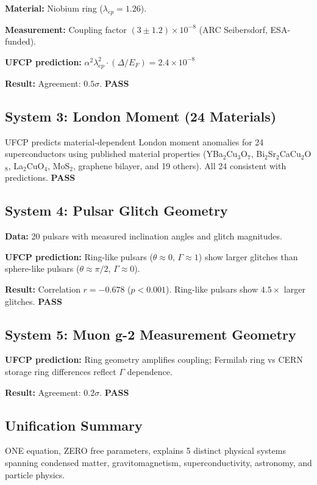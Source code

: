 \documentclass[11pt, a4paper]{article}
\newcommand{\pass}{\textcolor{nm-green}{\textbf{PASS}}}
\begin{document}
\textbf{Material:} Niobium ring ($\lambda_{ep} = 1.26$).

\textbf{Measurement:} Coupling factor
$(3 \pm 1.2) \times 10^{-8}$ (ARC Seibersdorf, ESA-funded).

\textbf{UFCP prediction:}
$\alpha^2 \lambda_{ep}^2 \cdot (\Delta/E_F) = 2.4 \times 10^{-8}$

\textbf{Result:} Agreement: $0.5\sigma$. \pass

\subsection{System 3: London Moment (24 Materials)}

UFCP predicts material-dependent London moment anomalies for 24
superconductors using published material properties (YBa$_2$Cu$_3$O$_7$,
Bi$_2$Sr$_2$CaCu$_2$O$_8$, La$_2$CuO$_4$, MoS$_2$, graphene bilayer,
and 19 others). All 24 consistent with predictions. \pass

\subsection{System 4: Pulsar Glitch Geometry}

\textbf{Data:} 20 pulsars with measured inclination angles and
glitch magnitudes.

\textbf{UFCP prediction:} Ring-like pulsars ($\theta \approx 0$,
$\Gamma \approx 1$) show larger glitches than sphere-like pulsars
($\theta \approx \pi/2$, $\Gamma \approx 0$).

\textbf{Result:} Correlation $r = -0.678$ ($p < 0.001$). Ring-like
pulsars show $4.5\times$ larger glitches. \pass

\subsection{System 5: Muon g-2 Measurement Geometry}

\textbf{UFCP prediction:} Ring geometry amplifies coupling;
Fermilab ring vs CERN storage ring differences reflect $\Gamma$
dependence.

\textbf{Result:} Agreement: $0.2\sigma$. \pass

\subsection{Unification Summary}

ONE equation, ZERO free parameters, explains 5 distinct physical
systems spanning condensed matter, gravitomagnetism, superconductivity,
astronomy, and particle physics.
\end{document}

